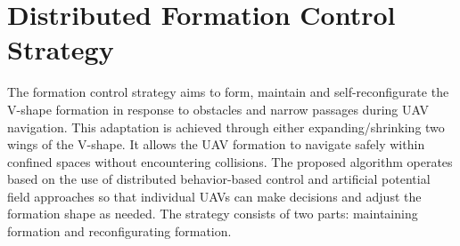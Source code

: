\section{Distributed Formation Control Strategy} \label{sec:0control}
The formation control strategy aims to form, maintain and self-reconfigurate the V-shape formation in response to obstacles and narrow passages during UAV navigation. This adaptation is achieved through either expanding/shrinking two wings of the V-shape. It allows the UAV formation to navigate safely within confined spaces without encountering collisions. The proposed algorithm operates based on the use of distributed behavior-based control and artificial potential field approaches so that individual UAVs can make decisions and adjust the formation shape as needed. The strategy consists of two parts: maintaining formation and reconfigurating formation.

